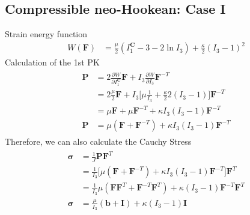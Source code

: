 \documentclass[12pt,3p]{article}
\numberwithin{equation}{section}
\begin{document}
\subsection{Compressible neo-Hookean: Case I}
Strain energy function 
\begin{align}
W(\mathbf{F}) &= \frac{\mu}{2} (I_1^{\mathbf{C}} - 3 - 2 \ln I_3) + \frac{\kappa}{2} (I_3 - 1)^2 
\end{align}
Calculation of the 1st PK
\begin{align}
\begin{split}
\mathbf{P} &= 2 \frac{\partial W}{\partial I_1^\mathbf{C}} \mathbf{F} + I_3 \frac{\partial W}{\partial I_3} \mathbf{F}^{-T} \\
		&= 2 \frac{\mu}{2} \mathbf{F} + I_3 \bigg[ \mu \frac{1}{I_3} + \frac{\kappa}{2} 2 (I_3 -1 ) \bigg]  \mathbf{F}^{-T} \\
		&= \mu \mathbf{F} + \mu \mathbf{F}^{-T} + \kappa I_3 (I_3 - 1) \mathbf{F}^{-T} \\
\mathbf{P} &= \mu (\mathbf{F} + \mathbf{F}^{-T}) + \kappa I_3 (I_3 - 1) \mathbf{F}^{-T} 
\end{split}
\end{align}
Therefore, we can also calculate the Cauchy Stress
\begin{align}
\begin{split}
\boldsymbol{\sigma} &= \frac{1}{J} \mathbf{P} \mathbf{F}^T\\
				&= \frac{1}{I_3} \bigg[ \mu (\mathbf{F} + \mathbf{F}^{-T}) + \kappa I_3 (I_3 - 1) \mathbf{F}^{-T} \bigg] \mathbf{F}^T \\
				&= \frac{1}{I_3} \mu (\mathbf{F} \mathbf{F}^T + \mathbf{F}^{-T} \mathbf{F}^T ) + \kappa (I_3 - 1) \mathbf{F}^{-T} \mathbf{F}^T \\
\boldsymbol{\sigma} &= \frac{\mu}{I_3} (\mathbf{b} + \mathbf{I}) + \kappa (I_3 - 1)\mathbf{I} 
\end{split}
\end{align}

\end{document}
